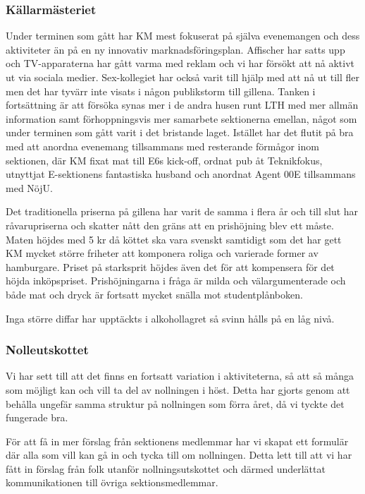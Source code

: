 \documentclass[../_main/handlingar.tex]{subfiles}
\begin{document}
\subsubsection*{Källarmästeriet}
Under terminen som gått har KM mest fokuserat på själva evenemangen och dess aktiviteter än på en ny innovativ marknadsföringsplan. Affischer har satts upp och TV-apparaterna har gått varma med reklam och vi har försökt att nå aktivt ut via sociala medier. Sex-kollegiet har också varit till hjälp med att nå ut till fler men det har tyvärr inte visats i någon publikstorm till gillena. Tanken i fortsättning är att försöka synas mer i de andra husen runt LTH med mer allmän information samt förhoppningsvis mer samarbete sektionerna emellan, något som under terminen som gått varit i det bristande laget. Istället har det flutit på bra med att anordna evenemang tillsammans med resterande förmågor inom sektionen, där KM fixat mat till E6s kick-off, ordnat pub åt Teknikfokus, utnyttjat E-sektionens fantastiska husband och anordnat Agent 00E tillsammans med NöjU.

Det traditionella priserna på gillena har varit de samma i flera år och till slut har råvarupriserna och skatter nått den gräns att en prishöjning blev ett måste. Maten höjdes med 5 kr då köttet ska vara svenskt samtidigt som det har gett KM mycket större friheter att komponera roliga och varierade former av hamburgare. Priset på starksprit höjdes även det för att kompensera för det höjda inköpspriset. Prishöjningarna i fråga är milda och välargumenterade och både mat och dryck är fortsatt mycket snälla mot studentplånboken.

Inga större diffar har upptäckts i alkohollagret så svinn hålls på en låg nivå.

\subsubsection*{Nolleutskottet}
Vi har sett till att det finns en fortsatt variation i aktiviteterna, så att så många som möjligt kan och vill ta del av nollningen i höst. Detta har gjorts genom att behålla ungefär samma struktur på nollningen som förra året, då vi tyckte det fungerade bra.

För att få in mer förslag från sektionens medlemmar har vi skapat ett formulär där alla som vill kan gå in och tycka till om nollningen. Detta lett till att vi har fått in förslag från folk utanför nollningsutskottet och därmed underlättat kommunikationen till övriga sektionsmedlemmar.
\end{document}
